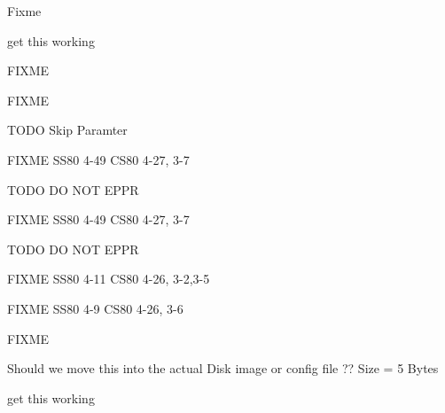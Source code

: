 \begin{DoxyRefList}
Fixme  
\item[\label{todo__todo000025}%
\hypertarget{todo__todo000025}{}%
Global \hyperlink{ss80_8h_af50a313d8234d38511925a0ca5a9a8a3}{S\+S80\+\_\+\+Test} (void)]get this working  
\item[\label{todo__todo000049}%
\hypertarget{todo__todo000049}{}%
Global \hyperlink{ss80_8h_a00d10ca5d1cb70d035927df06e90d36c}{S\+S80\+\_\+\+Transparent\+\_\+\+State} (void)]F\+I\+X\+ME 

F\+I\+X\+ME 

T\+O\+DO Skip Paramter 

F\+I\+X\+ME S\+S80 4-\/49 C\+S80 4-\/27, 3-\/7 

T\+O\+DO DO N\+OT E\+P\+PR 

F\+I\+X\+ME S\+S80 4-\/49 C\+S80 4-\/27, 3-\/7 

T\+O\+DO DO N\+OT E\+P\+PR 

F\+I\+X\+ME S\+S80 4-\/11 C\+S80 4-\/26, 3-\/2,3-\/5 

F\+I\+X\+ME S\+S80 4-\/9 C\+S80 4-\/26, 3-\/6  
\item[\label{todo__todo000062}%
\hypertarget{todo__todo000062}{}%
Global \hyperlink{ss80_8h_ac8a4c5dcd550e896c1e7cec68d2f70e5}{S\+S80\+\_\+\+Universal\+\_\+\+Device\+\_\+\+Clear} (void)]F\+I\+X\+ME  
\item[\label{todo__todo000012}%
\hypertarget{todo__todo000012}{}%
Global \hyperlink{drives_8c_a16d811299d42f1c1d920caa2b1423491}{S\+S80\+Disk} ]Should we move this into the actual Disk image or config file ?? Size = 5 Bytes 
\item[\label{todo__todo000024}%
\hypertarget{todo__todo000024}{}%
Global \hyperlink{ss80_8c_a239f4cd0f1360dbfd90fa043d1323e67}{TD} \mbox{[}\mbox{]}]get this working 
\end{DoxyRefList}
